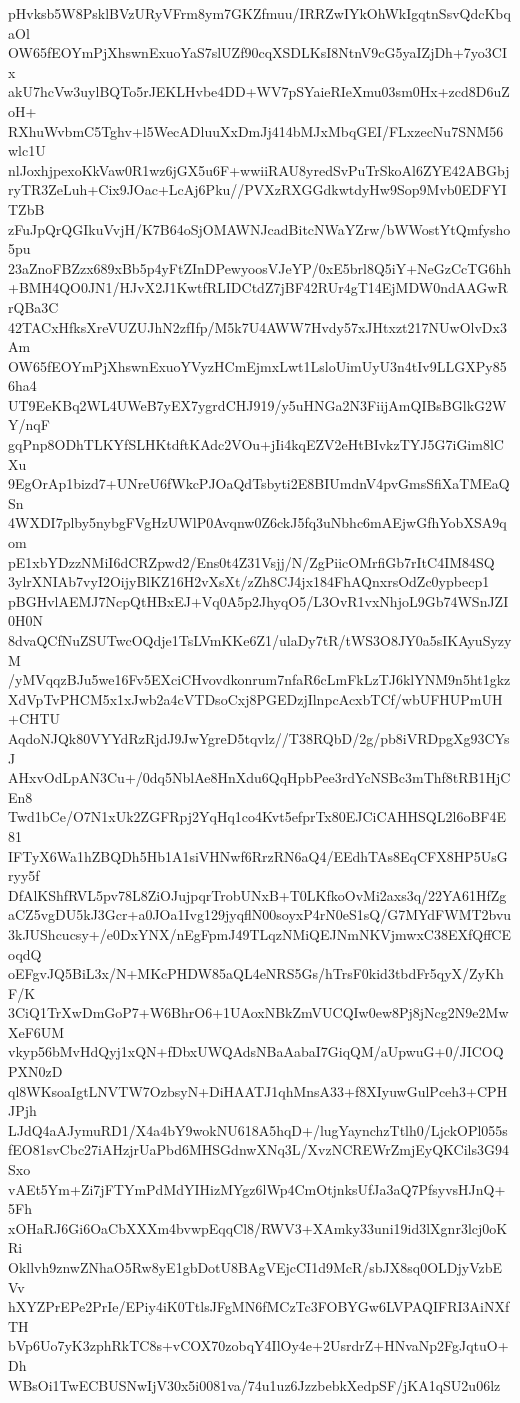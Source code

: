 pHvksb5W8PsklBVzURyVFrm8ym7GKZfmuu/IRRZwIYkOhWkIgqtnSsvQdcKbqaOl
OW65fEOYmPjXhswnExuoYaS7slUZf90cqXSDLKsI8NtnV9cG5yaIZjDh+7yo3CIx
akU7hcVw3uylBQTo5rJEKLHvbe4DD+WV7pSYaieRIeXmu03sm0Hx+zcd8D6uZoH+
RXhuWvbmC5Tghv+l5WecADluuXxDmJj414bMJxMbqGEI/FLxzecNu7SNM56wlc1U
nlJoxhjpexoKkVaw0R1wz6jGX5u6F+wwiiRAU8yredSvPuTrSkoAl6ZYE42ABGbj
ryTR3ZeLuh+Cix9JOac+LcAj6Pku//PVXzRXGGdkwtdyHw9Sop9Mvb0EDFYITZbB
zFuJpQrQGIkuVvjH/K7B64oSjOMAWNJcadBitcNWaYZrw/bWWostYtQmfysho5pu
23aZnoFBZzx689xBb5p4yFtZInDPewyoosVJeYP/0xE5brl8Q5iY+NeGzCcTG6hh
+BMH4QO0JN1/HJvX2J1KwtfRLIDCtdZ7jBF42RUr4gT14EjMDW0ndAAGwRrQBa3C
42TACxHfksXreVUZUJhN2zfIfp/M5k7U4AWW7Hvdy57xJHtxzt217NUwOlvDx3Am
OW65fEOYmPjXhswnExuoYVyzHCmEjmxLwt1LsloUimUyU3n4tIv9LLGXPy856ha4
UT9EeKBq2WL4UWeB7yEX7ygrdCHJ919/y5uHNGa2N3FiijAmQIBsBGlkG2WY/nqF
gqPnp8ODhTLKYfSLHKtdftKAdc2VOu+jIi4kqEZV2eHtBIvkzTYJ5G7iGim8lCXu
9EgOrAp1bizd7+UNreU6fWkcPJOaQdTsbyti2E8BIUmdnV4pvGmsSfiXaTMEaQSn
4WXDI7plby5nybgFVgHzUWlP0Avqnw0Z6ckJ5fq3uNbhc6mAEjwGfhYobXSA9qom
pE1xbYDzzNMiI6dCRZpwd2/Ens0t4Z31Vsjj/N/ZgPiicOMrfiGb7rItC4IM84SQ
3ylrXNIAb7vyI2OijyBlKZ16H2vXsXt/zZh8CJ4jx184FhAQnxrsOdZc0ypbecp1
pBGHvlAEMJ7NcpQtHBxEJ+Vq0A5p2JhyqO5/L3OvR1vxNhjoL9Gb74WSnJZI0H0N
8dvaQCfNuZSUTwcOQdje1TsLVmKKe6Z1/ulaDy7tR/tWS3O8JY0a5sIKAyuSyzyM
/yMVqqzBJu5we16Fv5EXciCHvovdkonrum7nfaR6cLmFkLzTJ6klYNM9n5ht1gkz
XdVpTvPHCM5x1xJwb2a4cVTDsoCxj8PGEDzjIlnpcAcxbTCf/wbUFHUPmUH+CHTU
AqdoNJQk80VYYdRzRjdJ9JwYgreD5tqvlz//T38RQbD/2g/pb8iVRDpgXg93CYsJ
AHxvOdLpAN3Cu+/0dq5NblAe8HnXdu6QqHpbPee3rdYcNSBc3mThf8tRB1HjCEn8
Twd1bCe/O7N1xUk2ZGFRpj2YqHq1co4Kvt5efprTx80EJCiCAHHSQL2l6oBF4E81
IFTyX6Wa1hZBQDh5Hb1A1siVHNwf6RrzRN6aQ4/EEdhTAs8EqCFX8HP5UsGryy5f
DfAlKShfRVL5pv78L8ZiOJujpqrTrobUNxB+T0LKfkoOvMi2axs3q/22YA61HfZg
aCZ5vgDU5kJ3Gcr+a0JOa1Ivg129jyqflN00soyxP4rN0eS1sQ/G7MYdFWMT2bvu
3kJUShcucsy+/e0DxYNX/nEgFpmJ49TLqzNMiQEJNmNKVjmwxC38EXfQffCEoqdQ
oEFgvJQ5BiL3x/N+MKcPHDW85aQL4eNRS5Gs/hTrsF0kid3tbdFr5qyX/ZyKhF/K
3CiQ1TrXwDmGoP7+W6BhrO6+1UAoxNBkZmVUCQIw0ew8Pj8jNcg2N9e2MwXeF6UM
vkyp56bMvHdQyj1xQN+fDbxUWQAdsNBaAabaI7GiqQM/aUpwuG+0/JICOQPXN0zD
ql8WKsoaIgtLNVTW7OzbsyN+DiHAATJ1qhMnsA33+f8XIyuwGulPceh3+CPHJPjh
LJdQ4aAJymuRD1/X4a4bY9wokNU618A5hqD+/lugYaynchzTtlh0/LjckOPl055s
fEO81svCbc27iAHzjrUaPbd6MHSGdnwXNq3L/XvzNCREWrZmjEyQKCils3G94Sxo
vAEt5Ym+Zi7jFTYmPdMdYIHizMYgz6lWp4CmOtjnksUfJa3aQ7PfsyvsHJnQ+5Fh
xOHaRJ6Gi6OaCbXXXm4bvwpEqqCl8/RWV3+XAmky33uni19id3lXgnr3lcj0oKRi
Okllvh9znwZNhaO5Rw8yE1gbDotU8BAgVEjcCI1d9McR/sbJX8sq0OLDjyVzbEVv
hXYZPrEPe2PrIe/EPiy4iK0TtlsJFgMN6fMCzTc3FOBYGw6LVPAQIFRI3AiNXfTH
bVp6Uo7yK3zphRkTC8s+vCOX70zobqY4IlOy4e+2UsrdrZ+HNvaNp2FgJqtuO+Dh
WBsOi1TwECBUSNwIjV30x5i0081va/74u1uz6JzzbebkXedpSF/jKA1qSU2u06lz
